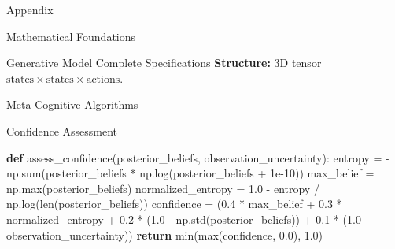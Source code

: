 \documentclass[
  ignorenonframetext,
]{beamer}
\newenvironment{Shaded}{}{}
\newcommand{\BuiltInTok}[1]{\textcolor[rgb]{0.00,0.50,0.00}{#1}}
\newcommand{\ControlFlowTok}[1]{\textcolor[rgb]{0.00,0.44,0.13}{\textbf{#1}}}
\newcommand{\FloatTok}[1]{\textcolor[rgb]{0.25,0.63,0.44}{#1}}
\newcommand{\KeywordTok}[1]{\textcolor[rgb]{0.00,0.44,0.13}{\textbf{#1}}}
\newcommand{\NormalTok}[1]{#1}
\newcommand{\OperatorTok}[1]{\textcolor[rgb]{0.40,0.40,0.40}{#1}}
\begin{document}
\begin{frame}[fragile]{Appendix}
\begin{block}{Mathematical Foundations}
\begin{block}{Generative Model Complete Specifications}
\textbf{Structure:} 3D tensor
\(\text{states} \times \text{states} \times \text{actions}\).
\end{block}
\end{block}

\begin{block}{Meta-Cognitive Algorithms}
\protect{}\label{sec:meta_cognitive_algorithms}
\begin{block}{Confidence Assessment}
\protect{}\label{confidence-assessment}
\begin{Shaded}
\begin{Highlighting}[]
\KeywordTok{def}\NormalTok{ assess\_confidence(posterior\_beliefs, observation\_uncertainty):}
\NormalTok{    entropy }\OperatorTok{=} \OperatorTok{{-}}\NormalTok{np.}\BuiltInTok{sum}\NormalTok{(posterior\_beliefs }\OperatorTok{*}\NormalTok{ np.log(posterior\_beliefs }\OperatorTok{+} \FloatTok{1e{-}10}\NormalTok{))}
\NormalTok{    max\_belief }\OperatorTok{=}\NormalTok{ np.}\BuiltInTok{max}\NormalTok{(posterior\_beliefs)}
\NormalTok{    normalized\_entropy }\OperatorTok{=} \FloatTok{1.0} \OperatorTok{{-}}\NormalTok{ entropy }\OperatorTok{/}\NormalTok{ np.log(}\BuiltInTok{len}\NormalTok{(posterior\_beliefs))}
\NormalTok{    confidence }\OperatorTok{=}\NormalTok{ (}\FloatTok{0.4} \OperatorTok{*}\NormalTok{ max\_belief }\OperatorTok{+}
                 \FloatTok{0.3} \OperatorTok{*}\NormalTok{ normalized\_entropy }\OperatorTok{+}
                 \FloatTok{0.2} \OperatorTok{*}\NormalTok{ (}\FloatTok{1.0} \OperatorTok{{-}}\NormalTok{ np.std(posterior\_beliefs)) }\OperatorTok{+}
                 \FloatTok{0.1} \OperatorTok{*}\NormalTok{ (}\FloatTok{1.0} \OperatorTok{{-}}\NormalTok{ observation\_uncertainty))}
    \ControlFlowTok{return} \BuiltInTok{min}\NormalTok{(}\BuiltInTok{max}\NormalTok{(confidence, }\FloatTok{0.0}\NormalTok{), }\FloatTok{1.0}\NormalTok{)}
\end{Highlighting}
\end{Shaded}
\end{block}


\end{block}
\end{frame}
\end{document}
